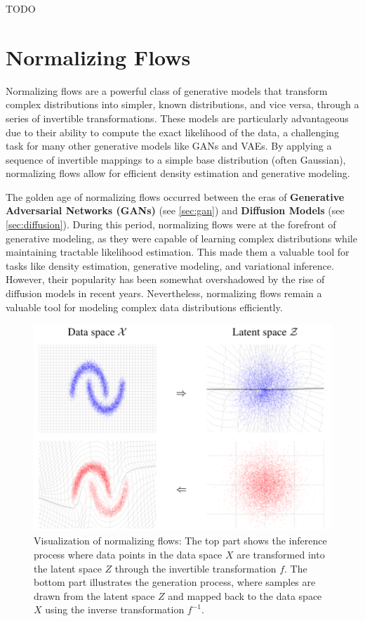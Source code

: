 \documentclass{article}
\begin{document}
TODO

\clearpage\newpage

\section{Normalizing Flows} \label{sec:flows}

Normalizing flows are a powerful class of generative models that transform complex distributions into simpler, known distributions, and vice versa, through a series of invertible transformations. These models are particularly advantageous due to their ability to compute the exact likelihood of the data, a challenging task for many other generative models like GANs and VAEs. By applying a sequence of invertible mappings to a simple base distribution (often Gaussian), normalizing flows allow for efficient density estimation and generative modeling. 

The golden age of normalizing flows occurred between the eras of \textbf{Generative Adversarial Networks (GANs)} (see \ref{sec:gan}) and \textbf{Diffusion Models} (see \ref{sec:diffusion}). During this period, normalizing flows were at the forefront of generative modeling, as they were capable of learning complex distributions while maintaining tractable likelihood estimation. This made them a valuable tool for tasks like density estimation, generative modeling, and variational inference. However, their popularity has been somewhat overshadowed by the rise of diffusion models in recent years. Nevertheless, normalizing flows remain a valuable tool for modeling complex data distributions efficiently.

\begin{figure}[ht]
    \centering
    \includegraphics[width=0.75\linewidth]{graphics/S9Flows/space_transformations.png}
    \caption{Visualization of normalizing flows: The top part shows the inference process where data points in the data space \(X\) are transformed into the latent space \(Z\) through the invertible transformation \(f\). The bottom part illustrates the generation process, where samples are drawn from the latent space \(Z\) and mapped back to the data space \(X\) using the inverse transformation \(f^{-1}\).}
    \label{fig:space-transformations}
\end{figure}
\end{document}

